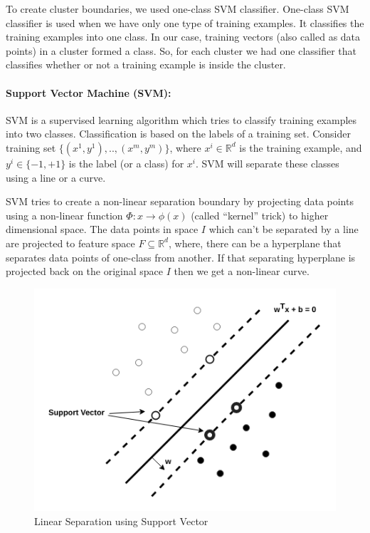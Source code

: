 \documentclass[12pt,oneside,a4paper]{article}
\begin{document}
To create cluster boundaries, we used one-class SVM classifier. One-class SVM classifier is used when we have only one type of training examples. It classifies the training examples into one class. In our case, training vectors (also called as data points) in a cluster formed a class. So, for each cluster we had one classifier that classifies whether or not a training example is inside the cluster.

\paragraph{Support Vector Machine (SVM):}

SVM is a supervised learning algorithm which tries to classify training examples into two classes. Classification is based on the labels of a training set.
Consider training set $\{(x^{1},y^{1}), .., (x^{m},y^{m})\}$, where $x^{i} \in \mathbb{R}^d$ is the training example, and $y^{i} \in \{-1, +1\}$ is the label (or a class) for $x^{i}$. SVM will separate these classes using a line or a curve.

SVM tries to create a non-linear separation boundary by projecting data points using a non-linear function $\Phi:x \rightarrow \phi(x)$ (called ``kernel'' trick) to higher dimensional space. The data points in space $I$ which can't be separated by a line are projected to feature space $F \subseteq \mathbb{R}^d$, where, there can be a hyperplane that separates data points of one-class from another. If that separating hyperplane is projected back on the original space $I$ then we get a non-linear curve.\cite{svm}

\begin{figure}[H]
\centering
\includegraphics[scale=0.5]{SVM.png}
\caption{Linear Separation using Support Vector} \label{fig:SVM}
\end{figure}
\end{document}
